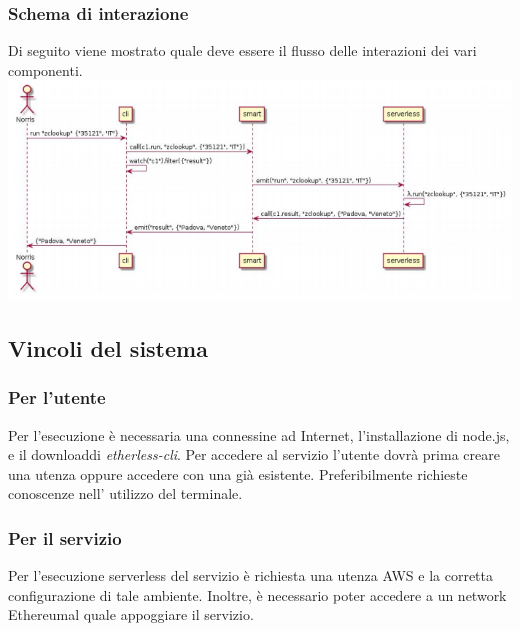 \subsubsection{Schema di interazione}
Di seguito viene mostrato quale deve essere il flusso delle interazioni dei vari componenti.\\
	\includegraphics[width=\textwidth]{res/img/calls-flow}
\subsection{Vincoli del sistema}
\subsubsection{Per l'utente}
Per l'esecuzione è necessaria una connessine ad Internet, l'installazione di node.js, e il download\glo di \textit{etherless-cli}. Per accedere al servizio l'utente dovrà prima creare una utenza oppure accedere con una già esistente. Preferibilmente richieste conoscenze nell' utilizzo del terminale\glo.
\subsubsection{Per il servizio}
Per l'esecuzione serverless del servizio è richiesta una utenza AWS e la corretta configurazione di tale ambiente. Inoltre, è necessario poter accedere a un network Ethereum\glo al quale appoggiare il servizio.
	
	